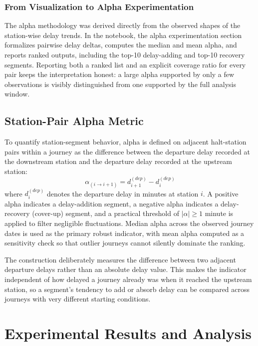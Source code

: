 \documentclass[conference]{IEEEtran}
\begin{document}
\subsubsection{From Visualization to Alpha Experimentation}
The alpha methodology was derived directly from the observed shapes of the station-wise delay trends. In the notebook, the alpha experimentation section formalizes pairwise delay deltas, computes the median and mean alpha, and reports ranked outputs, including the top-10 delay-adding and top-10 recovery segments. Reporting both a ranked list and an explicit coverage ratio for every pair keeps the interpretation honest: a large alpha supported by only a few observations is visibly distinguished from one supported by the full analysis window.

\subsection{Station-Pair Alpha Metric}
To quantify station-segment behavior, alpha is defined on adjacent halt-station pairs within a journey as the difference between the departure delay recorded at the downstream station and the departure delay recorded at the upstream station:
\begin{equation}
\alpha_{(i \rightarrow i+1)} = d_{i+1}^{(dep)} - d_i^{(dep)}
\label{eq:alpha}
\end{equation}
where $d_i^{(dep)}$ denotes the departure delay in minutes at station $i$. A positive alpha indicates a delay-addition segment, a negative alpha indicates a delay-recovery (cover-up) segment, and a practical threshold of $|\alpha| \geq 1$ minute is applied to filter negligible fluctuations. Median alpha across the observed journey dates is used as the primary robust indicator, with mean alpha computed as a sensitivity check so that outlier journeys cannot silently dominate the ranking.

The construction deliberately measures the difference between two adjacent departure delays rather than an absolute delay value. This makes the indicator independent of how delayed a journey already was when it reached the upstream station, so a segment's tendency to add or absorb delay can be compared across journeys with very different starting conditions.

\section{Experimental Results and Analysis}
\label{sec:results}
\end{document}
